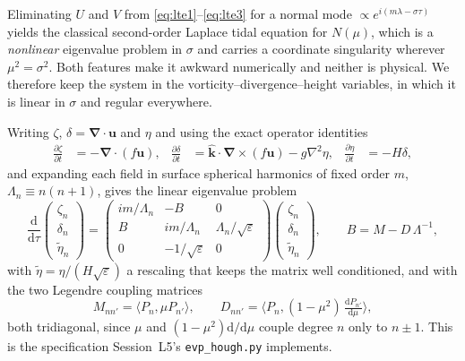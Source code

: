 \documentclass[11pt,a4paper]{article}
\newcommand{\file}[1]{\texttt{\nolinkurl{#1}}}
\newcommand{\dd}{\mathrm{d}}
\newcommand{\uvec}{\boldsymbol{u}}
\newcommand{\kvec}{\hat{\boldsymbol{k}}}
\newcommand{\grad}{\boldsymbol{\nabla}}
\begin{document}
Eliminating $U$ and $V$ from \eqref{eq:lte1}--\eqref{eq:lte3} for a normal mode
$\propto e^{i(m\lambda - \sigma\tau)}$ yields the classical second-order
Laplace tidal equation for $N(\mu)$, which is a \emph{nonlinear} eigenvalue
problem in $\sigma$ and carries a coordinate singularity wherever
$\mu^2 = \sigma^2$. Both features make it awkward numerically and neither is
physical. We therefore keep the system in the vorticity--divergence--height
variables, in which it is linear in $\sigma$ and regular everywhere.

Writing $\zeta$, $\delta = \grad\!\cdot\uvec$ and $\eta$ and using the exact
operator identities
%
\begin{align}
\frac{\partial\zeta}{\partial t} &= -\grad\!\cdot(f\uvec) , &
\frac{\partial\delta}{\partial t} &=
  \kvec\cdot\grad\!\times(f\uvec) - g\nabla^2\eta , &
\frac{\partial\eta}{\partial t} &= -H\delta ,
\label{eq:zdh}
\end{align}
%
and expanding each field in surface spherical harmonics of fixed order $m$,
$\Lambda_n \equiv n(n+1)$, gives the linear eigenvalue problem
%
\begin{equation}
\frac{\dd}{\dd\tau}\!
\begin{pmatrix}\zeta_n\\ \delta_n\\ \tilde\eta_n\end{pmatrix}
=
\begin{pmatrix}
 i m/\Lambda_n & -B & 0\\
 B & i m/\Lambda_n & \Lambda_n/\sqrt{\varepsilon}\\
 0 & -1/\sqrt{\varepsilon} & 0
\end{pmatrix}
\begin{pmatrix}\zeta_n\\ \delta_n\\ \tilde\eta_n\end{pmatrix},
\qquad
B = M - D\,\Lambda^{-1} ,
\label{eq:houghevp}
\end{equation}
%
with $\tilde\eta = \eta/(H\sqrt\varepsilon)$ a rescaling that keeps the matrix
well conditioned, and with the two Legendre coupling matrices
%
\begin{equation}
M_{nn'} = \big\langle P_n, \mu P_{n'}\big\rangle ,
\qquad
D_{nn'} = \Big\langle P_n, (1-\mu^2)\,\tfrac{\dd P_{n'}}{\dd\mu}\Big\rangle ,
\label{eq:legmat}
\end{equation}
%
both tridiagonal, since $\mu$ and $(1-\mu^2)\dd/\dd\mu$ couple degree $n$ only to
$n\pm1$. This is the specification Session~L5's \file{evp_hough.py}
implements.
\end{document}
